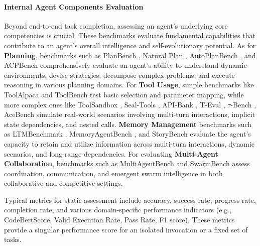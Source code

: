 \documentclass[10pt]{article} %
\begin{document}
\paragraph{Internal Agent Components Evaluation}
Beyond end-to-end task completion, assessing an agent's underlying core competencies is crucial. These benchmarks evaluate fundamental capabilities that contribute to an agent's overall intelligence and self-evolutionary potential. As for \textbf{Planning}, benchmarks such as PlanBench \citep{valmeekam2023planbench}, Natural Plan \citep{zheng2024natural}, AutoPlanBench \citep{stein2025automating}, and ACPBench \citep{kokel2025acpbench} comprehensively evaluate an agent's ability to understand dynamic environments, devise strategies, decompose complex problems, and execute reasoning in various planning domains. For \textbf{Tool Usage}, 
simple benchmarks like ToolAlpaca \citep{tang2023toolalpaca} and ToolBench \citep{qin2023toolllm} test basic selection and parameter mapping, while more complex ones like 
ToolSandbox \citep{lu2024toolsandbox}, Seal-Tools \citep{wu2024seal}, API-Bank \citep{li2023api}, T-Eval \citep{chen2023t}, $\tau$-Bench \citep{yao2024tau}, AceBench \citep{chen2025acebench} simulate real-world scenarios involving multi-turn interactions, implicit state dependencies, and nested calls. \textbf{Memory Management} benchmarks such as LTMBenchmark \citep{castillo-bolado2024beyond}, MemoryAgentBench \citep{hu2025evaluating}, and StoryBench \citep{wan2025storybench} evaluate the agent's capacity to retain and utilize information across multi-turn interactions, dynamic scenarios, and long-range dependencies. For evaluating \textbf{Multi-Agent Collaboration}, benchmarks such as MultiAgentBench \citep{zhu2025multiagentbench} and SwarmBench \citep{ruan2025benchmarking} assess coordination, communication, and emergent swarm intelligence in both collaborative and competitive settings.

Typical metrics for static assessment include accuracy, success rate, progress rate, completion rate, and various domain-specific performance indicators (e.g., {CodeBertScore}, Valid Execution Rate, Pass Rate, F1 score). These metrics provide a singular performance score for an isolated invocation or a fixed set of tasks.
\end{document}

